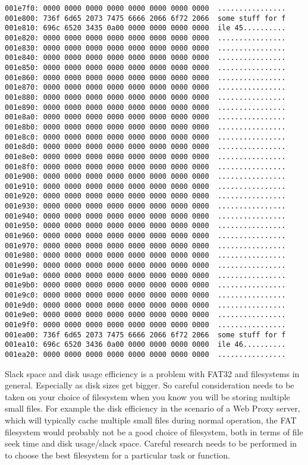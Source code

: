 \documentclass[a4paper,
    11pt,
    normalheadings,
    parindent,
    UKenglish,
    abstracton,
    ]{scrartcl}
\begin{document}
\begin{verbatim}
001e7f0: 0000 0000 0000 0000 0000 0000 0000 0000  ................
001e800: 736f 6d65 2073 7475 6666 2066 6f72 2066  some stuff for f
001e810: 696c 6520 3435 0a00 0000 0000 0000 0000  ile 45..........
001e820: 0000 0000 0000 0000 0000 0000 0000 0000  ................
001e830: 0000 0000 0000 0000 0000 0000 0000 0000  ................
001e840: 0000 0000 0000 0000 0000 0000 0000 0000  ................
001e850: 0000 0000 0000 0000 0000 0000 0000 0000  ................
001e860: 0000 0000 0000 0000 0000 0000 0000 0000  ................
001e870: 0000 0000 0000 0000 0000 0000 0000 0000  ................
001e880: 0000 0000 0000 0000 0000 0000 0000 0000  ................
001e890: 0000 0000 0000 0000 0000 0000 0000 0000  ................
001e8a0: 0000 0000 0000 0000 0000 0000 0000 0000  ................
001e8b0: 0000 0000 0000 0000 0000 0000 0000 0000  ................
001e8c0: 0000 0000 0000 0000 0000 0000 0000 0000  ................
001e8d0: 0000 0000 0000 0000 0000 0000 0000 0000  ................
001e8e0: 0000 0000 0000 0000 0000 0000 0000 0000  ................
001e8f0: 0000 0000 0000 0000 0000 0000 0000 0000  ................
001e900: 0000 0000 0000 0000 0000 0000 0000 0000  ................
001e910: 0000 0000 0000 0000 0000 0000 0000 0000  ................
001e920: 0000 0000 0000 0000 0000 0000 0000 0000  ................
001e930: 0000 0000 0000 0000 0000 0000 0000 0000  ................
001e940: 0000 0000 0000 0000 0000 0000 0000 0000  ................
001e950: 0000 0000 0000 0000 0000 0000 0000 0000  ................
001e960: 0000 0000 0000 0000 0000 0000 0000 0000  ................
001e970: 0000 0000 0000 0000 0000 0000 0000 0000  ................
001e980: 0000 0000 0000 0000 0000 0000 0000 0000  ................
001e990: 0000 0000 0000 0000 0000 0000 0000 0000  ................
001e9a0: 0000 0000 0000 0000 0000 0000 0000 0000  ................
001e9b0: 0000 0000 0000 0000 0000 0000 0000 0000  ................
001e9c0: 0000 0000 0000 0000 0000 0000 0000 0000  ................
001e9d0: 0000 0000 0000 0000 0000 0000 0000 0000  ................
001e9e0: 0000 0000 0000 0000 0000 0000 0000 0000  ................
001e9f0: 0000 0000 0000 0000 0000 0000 0000 0000  ................
001ea00: 736f 6d65 2073 7475 6666 2066 6f72 2066  some stuff for f
001ea10: 696c 6520 3436 0a00 0000 0000 0000 0000  ile 46..........
001ea20: 0000 0000 0000 0000 0000 0000 0000 0000  ................
\end{verbatim}

Slack space and disk usage efficiency is a problem with FAT32 and filesystems in general. Especially as disk sizes get bigger. So careful consideration needs to be taken on your choice of filesystem when you know you will be storing multiple small files. For example the disk efficiency in the scenario of a Web Proxy server, which will typically cache multiple small files during normal operation, the FAT filesystem would probably not be a good choice of filesystem, both in terms of file seek time and disk usage/slack space. Careful research needs to be performed in to choose the best filesystem for a particular task or function.
\end{document}
